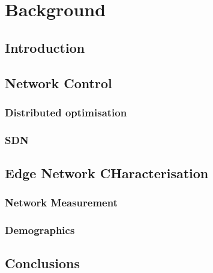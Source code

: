\chapter{Background} \label{ch:background}
\ifpdf
    \graphicspath{{Background/BackgroundFigs/PNG/}{Chapter3/BackgroundFigs/PDF/}{Background/BackgroundFigs/}}
\else
    \graphicspath{{Background/BackgroundFigs/EPS/}{Background/BackgroundFigs/}}
\fi

\section{Introduction}

\section{Network Control}
\subsection{Distributed optimisation}
\subsection{SDN}

\section{Edge Network CHaracterisation}
\subsection{Network Measurement}
\subsection{Demographics}

\section{Conclusions}

